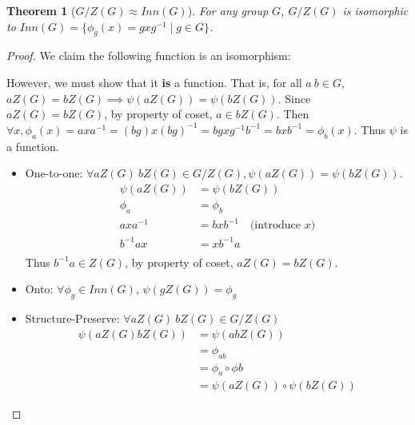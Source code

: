 \documentclass[14pt]{extarticle}
\newtheorem{theorem}{Theorem}[section]
\newcommand{\inv}[1]{#1^{-1}}
\begin{document}
\begin{theorem}[$G/Z(G) \approx Inn(G)$]
  For any group $G$, $G/Z(G)$ is isomorphic to 
  $Inn(G) = \{ \phi_g(x) = gx\inv{g} \mid g \in G \}$.
\end{theorem}
\begin{proof}
  We claim the following function is an isomorphism:
  \begin{center}
  \end{center} 

  However, we must show that it \textbf{is} a function. 
  That is, for all $a \ b \in G$, $aZ(G) = bZ(G) \implies \psi(aZ(G)) = \psi(bZ(G))$.
  Since $aZ(G) = bZ(G)$, by property of coset, $a \in bZ(G)$. 
  Then $\forall x, \phi_a(x) = ax\inv{a} = (bg)x\inv{(bg)} = bgx\inv{g}\inv{b} = bx\inv{b} = \phi_b(x)$.
  Thus $\psi$ is a function.

  \begin{itemize}
    \item One-to-one: $\forall aZ(G) \ bZ(G) \in G/Z(G), \psi(aZ(G)) = \psi(bZ(G))$.
      \begin{align*}
        \psi(aZ(G)) &= \psi(bZ(G)) \\
        \phi_a &= \phi_b \\
        ax\inv{a} &= bx\inv{b} \quad \text{(introduce $x$)} \\ 
        \inv{b}ax &= x \inv{b}a \\
      \end{align*}
      Thus $\inv{b}a \in Z(G)$, by property of coset, $aZ(G) = bZ(G)$.
    \item Onto: $\forall \phi_g \in Inn(G)$, $\psi(gZ(G)) = \phi_g$
    \item Structure-Preserve: $\forall aZ(G) \ bZ(G) \in G/Z(G)$
      \begin{align*}
        \psi(aZ(G)bZ(G)) 
          &= \psi(abZ(G)) \\
          &= \phi_{ab} \\
          &= \phi_{a} \circ \phi{b} \\
          &= \psi(aZ(G)) \circ \psi(bZ(G))
      \end{align*}
  \end{itemize}
\end{proof}
\end{document}
